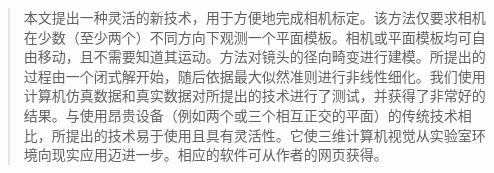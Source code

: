 \begin{abstract}
本文提出一种灵活的新技术，用于方便地完成相机标定。该方法仅要求相机在少数（至少两个）不同方向下观测一个平面模板。相机或平面模板均可自由移动，且不需要知道其运动。方法对镜头的径向畸变进行建模。所提出的过程由一个闭式解开始，随后依据最大似然准则进行非线性细化。我们使用计算机仿真数据和真实数据对所提出的技术进行了测试，并获得了非常好的结果。与使用昂贵设备（例如两个或三个相互正交的平面）的传统技术相比，所提出的技术易于使用且具有灵活性。它使三维计算机视觉从实验室环境向现实应用迈进一步。相应的软件可从作者的网页获得。
\end{abstract}
